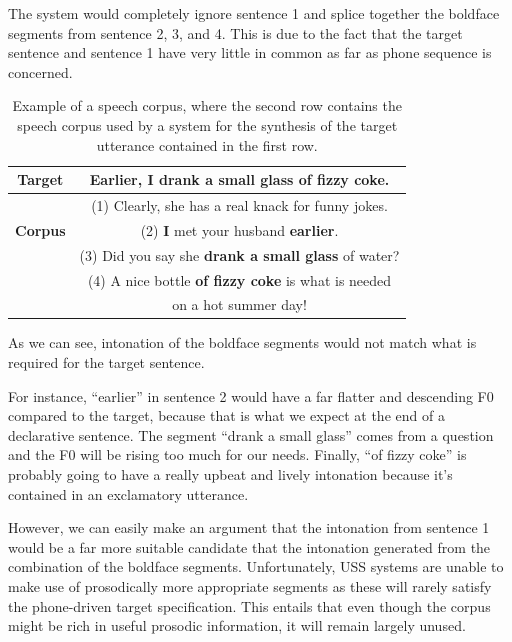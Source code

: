 The system would completely ignore sentence 1 and splice together the boldface segments from sentence 2, 3, and 4. 
This is due to the fact that the target sentence and sentence 1 have very little in common as far as phone sequence is concerned.

\begin{table}[h!]
\begin{center}
\begin{tabular}[c]{| c | c |}
\hline
\textbf{Target} & Earlier, I drank a small glass of fizzy coke.\\
\hline
                & (1) Clearly, she has a real knack for funny jokes.\\
\textbf{Corpus} & (2) \textbf{I} met your husband \textbf{earlier}.\\
                & (3) Did you say she \textbf{drank a small glass} of water?\\
                & (4) A nice bottle \textbf{of fizzy coke} is what is needed \\
                &   on a hot summer day!\\
\hline
\end{tabular}
\end{center}
\caption[Unit selection speech corpus.]{Example of a speech corpus, where the second row contains the speech corpus used by a  system for the synthesis of the target utterance contained in the first row.}
\label{tab:uss-corpus}
\end{table}

As we can see, intonation of the boldface segments would not match what is required for the target sentence. 

For instance, ``earlier'' in sentence 2 would have a far flatter and descending \ac{F0} compared to the target, because that is what we expect at the end of a declarative sentence. 
The segment ``drank a small glass'' comes from a question and the \ac{F0} will be rising too much for our needs. 
Finally, ``of fizzy coke'' is probably going to have a really upbeat and lively intonation because it's contained in an exclamatory utterance. 

However, we can easily make an argument that the intonation from sentence 1 would be a far more suitable candidate that the intonation generated from the combination of the boldface segments.
Unfortunately, \ac{USS} systems are unable to make use of prosodically more appropriate segments as these will rarely satisfy the phone-driven target specification.
This entails that even though the corpus might be rich in useful prosodic information, it will remain largely unused.



